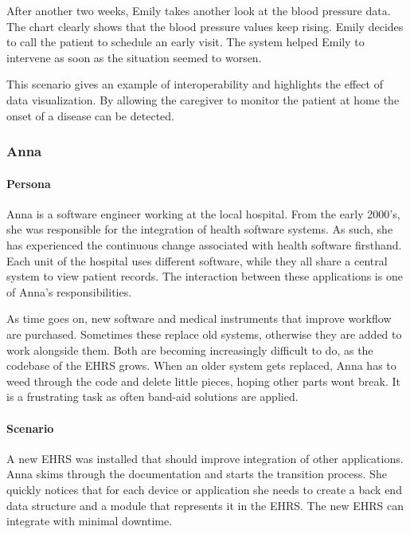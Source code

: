         After another two weeks, Emily takes another look at the blood pressure data. The chart clearly shows that the blood pressure values keep rising. Emily decides to call the patient to schedule an early visit. The system helped Emily to intervene as soon as the situation seemed to worsen.\bigskip

        \noindent This scenario gives an example of interoperability and highlights the effect of data visualization. By allowing the caregiver to monitor the patient at home the onset of a disease can be detected.

        \subsubsection{Anna}

        \paragraph{Persona} Anna is a software engineer working at the local hospital. From the early 2000's, she was responsible for the integration of health software systems. As such, she has experienced the continuous change associated with health software firsthand. Each unit of the hospital uses different software, while they all share a central system to view patient records. The interaction between these applications is one of Anna's responsibilities.

        As time goes on, new software and medical instruments that improve workflow are purchased. Sometimes these replace old systems, otherwise they are added to work alongside them. Both are becoming increasingly difficult to do, as the codebase of the EHRS grows. When an older system gets replaced, Anna has to weed through the code and delete little pieces, hoping other parts wont break. It is a frustrating task as often band-aid solutions are applied.

        \paragraph{Scenario} A new EHRS was installed that should improve integration of other applications. Anna skims through the documentation and starts the transition process. She quickly notices that for each device or application she needs to create a back end data structure and a module that represents it in the EHRS\@. The new EHRS can integrate with minimal downtime.


